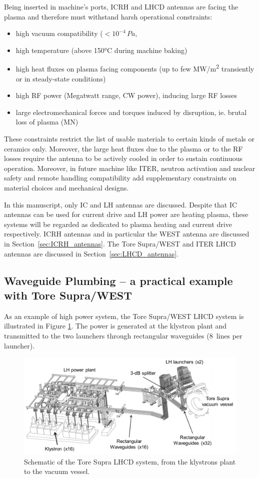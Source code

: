 Being inserted in machine's ports, ICRH and LHCD antennas are facing the plasma and therefore must  withstand harsh operational constraints: 
\begin{itemize}
	\item high vacuum compatibility ($<10^{-4}\,\si{Pa}$, 
	\item high temperature (above 150°C during machine baking)
	\item high heat fluxes on plasma facing components (up to few \si{MW/m^2} transiently or in steady-state conditions)
	\item high RF power (Megatwatt range, CW power), inducing large RF losses
	\item large electromechanical forces and torques induced by disruption, ie. brutal loss of plasma (\si{MN})
\end{itemize}
These constraints restrict the list of usable materials to certain kinds of metals or ceramics only. Moreover, the large heat fluxes due to the plasma or to the RF losses require the antenna to be actively cooled in order to sustain continuous operation. Moreover, in future machine like ITER, neutron activation and nuclear safety and remote handling compatibility  add supplementary constraints on material choices and mechanical designs.

In this manuscript, only IC and LH antennas are discussed. Despite that IC antennas can be used for current drive and LH power are heating plasma, these systems will be regarded as dedicated to plasma heating and current drive respectively. ICRH antennas and in particular the WEST antenna are discussed in Section~\ref{sec:ICRH_antennas}. The Tore Supra/WEST and ITER LHCD antennas are discussed in Section~\ref{sec:LHCD_antennas}.


\subsection{Waveguide Plumbing – a practical example with Tore Supra/WEST}
As an example of high power system, the Tore Supra/WEST LHCD system is illustrated in Figure \ref{fig:toresupralhcdsystem}. The power is generated at the klystron plant and transmitted to the two launchers through rectangular waveguides (8~lines per launcher). 

\begin{figure}
	\centering
	\includegraphics[width=0.9\linewidth]{figures/chap1/ToreSupra_LHCD_System}
	\caption{Schematic of the Tore Supra LHCD system, from the klystrons plant to the vacuum vessel.}
	\label{fig:toresupralhcdsystem}
\end{figure}

